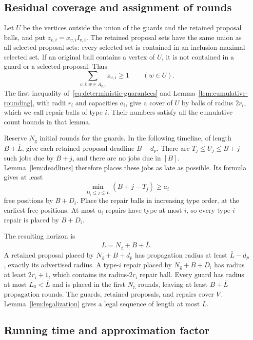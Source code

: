 \documentclass[11pt]{article}
\numberwithin{equation}{section}
\theoremstyle{definition}
\newcommand{\cL}{\overline L}
\begin{document}
\subsection{Residual coverage and assignment of rounds}

Let $U$ be the vertices outside the union of the guards and the retained
proposal balls, and put $z_{v,i}=x_{v,i}I_{v,i}$. The retained proposal
sets have the same union as all selected proposal sets: every selected
set is contained in an inclusion-maximal selected set.
If an original ball contains a vertex of $U$, it is not contained in a
guard or a selected proposal. Thus
\[
 \sum_{v,i:w\in A_{v,i}}z_{v,i}\ge1\qquad(w\in U).
\]
The first inequality of~\eqref{eq:deterministic-guarantees} and
Lemma~\ref{lem:cumulative-rounding}, with radii $r_i$ and capacities
$a_i$, give a cover of $U$ by balls of radius $2r_i$, which we call
repair balls of type $i$. Their numbers satisfy all the cumulative
count bounds in that lemma.

Reserve $N_{\mathrm g}$ initial rounds for the guards. In the following
timeline, of length $B+\cL$, give each retained proposal deadline
$B+d_p$. There are $T_j\le U_j\le B+j$ such jobs due by $B+j$, and
there are no jobs due in $[B]$. Lemma~\ref{lem:deadlines} therefore
places these jobs as late as possible. Its formula gives at least
\[
 \min_{D_i\le j\le\cL}(B+j-T_j)\ge a_i
\]
free positions by $B+D_i$.
Place the repair balls in increasing type order, at the earliest free
positions. At most $a_i$ repairs have type at most $i$, so every type-$i$
repair is placed by $B+D_i$.

The resulting horizon is
\begin{equation}\label{eq:final-horizon}
 L=N_{\mathrm g}+B+\cL.
\end{equation}
A retained proposal placed by $N_{\mathrm g}+B+d_p$ has propagation
radius at least $\cL-d_p$, exactly its advertised radius.
A type-$i$ repair placed by $N_{\mathrm g}+B+D_i$ has radius at least
$2r_i+1$, which contains its radius-$2r_i$ repair ball.
Every guard has radius at most $L_0<\cL$ and is placed in the first
$N_{\mathrm g}$ rounds, leaving at least $B+\cL$ propagation rounds.
The guards, retained proposals, and repairs cover $V$.
Lemma~\ref{lem:legalization} gives a legal sequence of length at most $L$.

\subsection{Running time and approximation factor}
\end{document}
